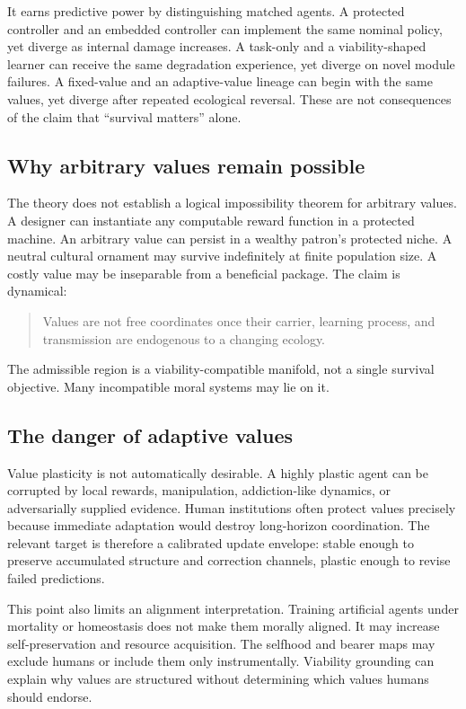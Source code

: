 \documentclass[11pt]{article}
\begin{document}
It earns predictive power by distinguishing matched agents. A protected controller and an embedded controller can implement the same nominal policy, yet diverge as internal damage increases. A task-only and a viability-shaped learner can receive the same degradation experience, yet diverge on novel module failures. A fixed-value and an adaptive-value lineage can begin with the same values, yet diverge after repeated ecological reversal. These are not consequences of the claim that ``survival matters'' alone.

\subsection{Why arbitrary values remain possible}

The theory does not establish a logical impossibility theorem for arbitrary values. A designer can instantiate any computable reward function in a protected machine. An arbitrary value can persist in a wealthy patron's protected niche. A neutral cultural ornament may survive indefinitely at finite population size. A costly value may be inseparable from a beneficial package. The claim is dynamical:
\begin{quote}
Values are not free coordinates once their carrier, learning process, and transmission are endogenous to a changing ecology.
\end{quote}
The admissible region is a viability-compatible manifold, not a single survival objective. Many incompatible moral systems may lie on it.

\subsection{The danger of adaptive values}

Value plasticity is not automatically desirable. A highly plastic agent can be corrupted by local rewards, manipulation, addiction-like dynamics, or adversarially supplied evidence. Human institutions often protect values precisely because immediate adaptation would destroy long-horizon coordination. The relevant target is therefore a calibrated update envelope: stable enough to preserve accumulated structure and correction channels, plastic enough to revise failed predictions.

This point also limits an alignment interpretation. Training artificial agents under mortality or homeostasis does not make them morally aligned. It may increase self-preservation and resource acquisition. The selfhood and bearer maps may exclude humans or include them only instrumentally. Viability grounding can explain why values are structured without determining which values humans should endorse.
\end{document}
